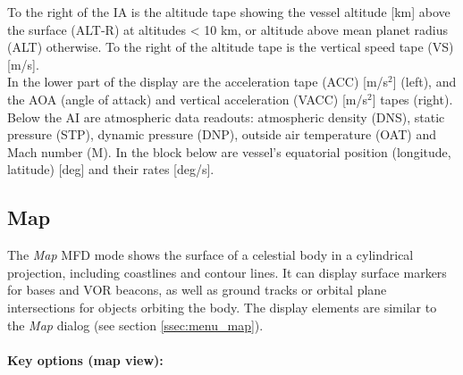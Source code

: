 \documentclass[Orbiter User Manual.tex]{subfiles}
\begin{document}
\noindent
To the right of the IA is the altitude tape showing the vessel altitude [km] above the surface (ALT-R) at altitudes < 10 km, or altitude above mean planet radius (ALT) otherwise. To the right of the altitude tape is the vertical speed tape (VS) [m/s].\\
In the lower part of the display are the acceleration tape (ACC) [m/s$^{2}$] (left), and the AOA (angle of attack) and vertical acceleration (VACC) [m/s$^{2}$] tapes (right).\\
Below the AI are atmospheric data readouts: atmospheric density (DNS), static pressure (STP), dynamic pressure (DNP), outside air temperature (OAT) and Mach number (M). In the block below are vessel's equatorial position (longitude, latitude) [deg] and their rates [deg/s].


\subsection{Map}
\label{ssec:mfd_map}
The \textit{Map} MFD mode shows the surface of a celestial body in a cylindrical projection, including coastlines and contour lines. It can display surface markers for bases and VOR beacons, as well as ground tracks or orbital plane intersections for objects orbiting the body. The display elements are similar to the \textit{Map} dialog (see section \ref{ssec:menu_map}).\\
\\
\textbf{Key options (map view):}
\end{document}
